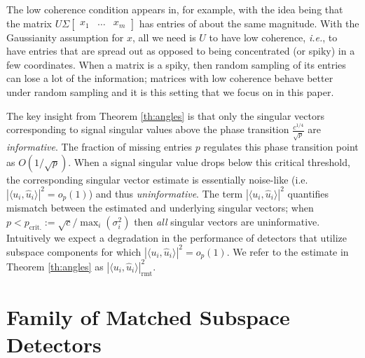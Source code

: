 The low coherence condition appears in, for example, \cite{balzano2010high} with the idea being that the matrix $U\Sigma \begin{bmatrix} x_{1} & \ldots & x_{m} \end{bmatrix}$ has entries of about the same magnitude. With the Gaussianity assumption for $x$, all we need is $U$ to have low coherence, \textit{i.e.}, to have entries that are spread out as opposed to being concentrated (or spiky) in a few coordinates. When a matrix is a spiky, then random sampling of its entries can lose a lot of the information; matrices with low coherence behave better under random sampling and it is this setting that we focus on in this paper. 

The key insight from Theorem \ref{th:angles} is that only the singular vectors corresponding to signal singular values above the phase transition $\frac{c^{1/4}}{\sqrt{p}}$ are \textit{informative}. The fraction of missing entries $p$ regulates this phase transition point as $O(1/\sqrt{p})$. When a signal singular value drops below this critical threshold, the corresponding singular vector estimate is essentially noise-like  (i.e. $|\langle u_i,\widehat{u}_i\rangle|^2=o_{p}(1)$) and thus \textit{uninformative}. The term $|\langle u_i,\widehat{u}_i\rangle|^2$ quantifies mismatch between the estimated and underlying singular vectors;  when $p < p_{\text{crit.}} :=\sqrt{c}/\max_{i}(\sigma_{i}^{2})$ then \textit{all} singular vectors are uninformative. Intuitively we expect a degradation in the performance of detectors  that utilize subspace components for which $|\langle u_i,\widehat{u}_i\rangle|^2=o_{p}(1)$.  We refer to the estimate in Theorem \ref{th:angles} as $|\langle u_i,\widehat{u}_i\rangle|^2_{\text{rmt}}$.

\section{Family of Matched Subspace Detectors}\label{sec:derive}

